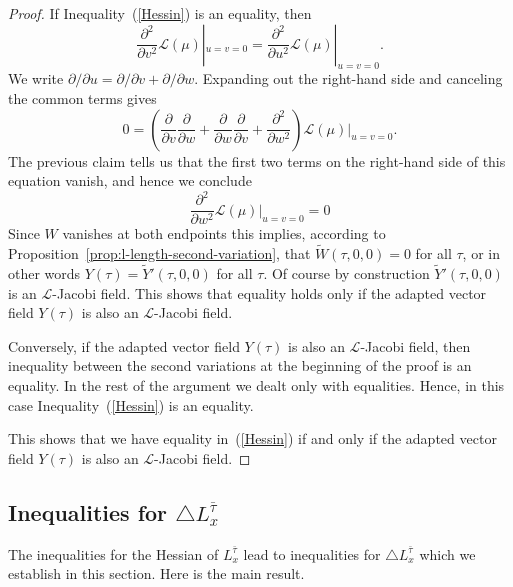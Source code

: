 \begin{proof}
If Inequality~(\ref{Hessin}) is an equality, then
$$\frac{\partial^2}{\partial v^2}{\mathcal L}(\mu)|_{u=v=0}=\frac{\partial^2}{\partial u^2}{\mathcal
L}(\mu)|_{u=v=0}.$$ We write $\partial/\partial u=\partial/\partial
v+\partial/\partial w$. Expanding out the right-hand side and
canceling the common terms gives
$$0=\left(\frac{\partial}{\partial v}\frac{\partial}{\partial w}+
\frac{\partial}{\partial w}\frac{\partial}{\partial
v}+\frac{\partial^2}{\partial w^2}\right){\mathcal
L}(\mu)|_{u=v=0}.$$ The previous claim tells us that the first two
terms on the right-hand side of this equation vanish, and hence we
conclude
$$\frac{\partial^2}{\partial w^2}{\mathcal L}(\mu)|_{u=v=0}=0$$
Since $W$ vanishes at both endpoints this implies, according to
Proposition~\ref{prop:l-length-second-variation}, that $\widetilde W(\tau,0,0)=0$ for all
$\tau$, or in other words $Y(\tau)=\widetilde Y'(\tau,0,0)$ for all
$\tau$. Of course by construction $\widetilde Y'(\tau,0,0)$ is an
${\mathcal L}$-Jacobi field. This shows that equality holds only if
the adapted vector field $Y(\tau)$ is also an ${\mathcal L}$-Jacobi
field.

Conversely, if the adapted vector field $Y(\tau)$ is also an
${\mathcal L}$-Jacobi field, then inequality between the second
variations at the beginning of the proof is an equality. In the rest
of the argument we dealt only with equalities. Hence, in this case
Inequality~(\ref{Hessin}) is an equality.

This shows that we have equality in~(\ref{Hessin}) if and only if
the adapted vector field $Y(\tau)$ is also an ${\mathcal L}$-Jacobi
field.
\end{proof}


\subsection{Inequalities for $\triangle L_x^{\bar\tau}$}

The inequalities for the Hessian of $L_x^{\bar\tau}$ lead to
inequalities for $\triangle L_x^{\bar\tau}$ which we establish in this section. Here is the
main result.


